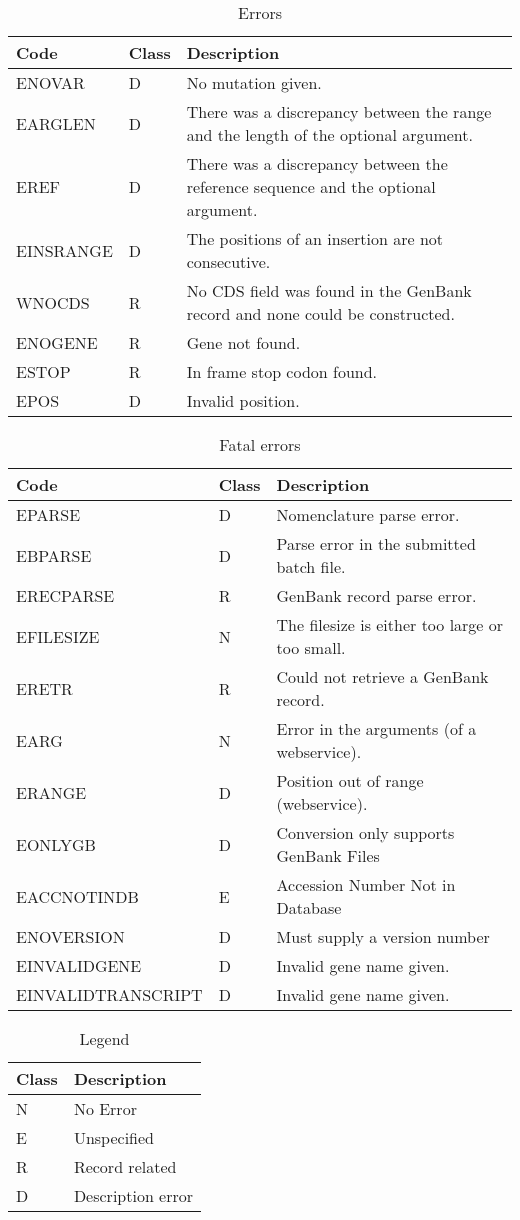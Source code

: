 \begin{table}[H]
\begin{center}
\begin{tabular}{l|l|p{7cm}}
Code & Class & Description \\
\hline
ENOVAR      & D & No mutation given. \\
EARGLEN     & D & There was a discrepancy between the range and the length of
                  the optional argument. \\
EREF        & D & There was a discrepancy between the reference sequence and 
                  the optional argument. \\
EINSRANGE   & D & The positions of an insertion are not consecutive. \\
WNOCDS      & R & No CDS field was found in the GenBank record and none could
                  be constructed. \\
ENOGENE     & R & Gene not found. \\
ESTOP       & R & In frame stop codon found. \\
EPOS        & D & Invalid position.
\end{tabular}
\end{center}
\caption{Errors} \label{tab:errors}
\end{table}

\begin{table}[H]
\begin{center}
\begin{tabular}{l|l|p{6cm}}
Code & Class & Description \\
\hline
EPARSE             & D & Nomenclature parse error. \\
EBPARSE            & D & Parse error in the submitted batch file. \\
ERECPARSE          & R & GenBank record parse error. \\
EFILESIZE          & N & The filesize is either too large or too small. \\
ERETR              & R & Could not retrieve a GenBank record. \\
EARG               & N & Error in the arguments (of a webservice). \\
ERANGE             & D & Position out of range (webservice). \\
EONLYGB            & D & Conversion only supports GenBank Files \\
EACCNOTINDB        & E & Accession Number Not in Database \\
ENOVERSION         & D & Must supply a version number \\
EINVALIDGENE       & D & Invalid gene name given. \\
EINVALIDTRANSCRIPT & D & Invalid gene name given.
\end{tabular}
\end{center}
\caption{Fatal errors} \label{tab:fatal}
\end{table}

\begin{table}[H]
\begin{center}
\begin{tabular}{l|l}
Class & Description \\
\hline
N & No Error \\
E & Unspecified \\
R & Record related \\
D & Description error
\end{tabular}
\end{center}
\caption{Legend} \label{tab:legend}
\end{table}
